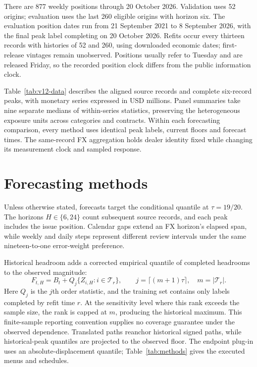 \documentclass{rQUF2e}
\begin{document}
There are 877 weekly positions through 20 October 2026. Validation uses 52 origins; evaluation uses the last 260 eligible origins with horizon six. The evaluation position dates run from 21 September 2021 to 8 September 2026, with the final peak label completing on 20 October 2026. Refits occur every thirteen records with histories of 52 and 260, using downloaded economic dates; first-release vintages remain unobserved. Positions usually refer to Tuesday and are released Friday, so the recorded position clock differs from the public information clock.

Table~\ref{tab:v12-data} describes the aligned source records and complete six-record peaks, with monetary series expressed in USD millions. Panel summaries take nine separate medians of within-series statistics, preserving the heterogeneous exposure units across categories and contracts. Within each forecasting comparison, every method uses identical peak labels, current floors and forecast times. The same-record FX aggregation holds dealer identity fixed while changing its measurement clock and sampled response.



\FloatBarrier

\section{Forecasting methods}\label{sec:methods}

Unless otherwise stated, forecasts target the conditional quantile at \(\tau=19/20\). The horizons \(H\in\{6,24\}\) count subsequent source records, and each peak includes the issue position. Calendar gaps extend an FX horizon's elapsed span, while weekly and daily steps represent different review intervals under the same nineteen-to-one error-weight preference.

Historical headroom adds a corrected empirical quantile of completed headrooms to the observed magnitude:
\[
F_{t,H}=B_t+Q_j\{Z_{i,H}:i\in\mathcal T_r\},\qquad
j=\lceil(m+1)\tau\rceil,\quad m=|\mathcal T_r|.
\]
Here \(Q_j\) is the \(j\)th order statistic, and the training set contains only labels completed by refit time \(r\).
At the sensitivity level where this rank exceeds the sample size, the rank is capped at \(m\), producing the historical maximum.
This finite-sample reporting convention supplies no coverage guarantee under the observed dependence. Translated paths reanchor historical signed paths, while historical-peak quantiles are projected to the observed floor. The endpoint plug-in uses an absolute-displacement quantile; Table~\ref{tab:methods} gives the executed menus and schedules.
\end{document}
